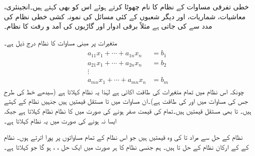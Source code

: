 خطی تفرقی مساوات کے نظام کا نام چھوٹا کرتے ہوئے اس کو   بھی کہتے ہیں۔انجینئری، معاشیات، شماریات، اور دیگر شعبوں کے کئی مسائل کی نمونہ کشی خطی نظام کی مدد سے کی جاتی ہے مثلاً برقی ادوار اور گاڑیوں کی آمد و رفت کا نظام۔

 متغیرات پر مبنی  مساوات کا نظام درج ذیل ہے۔
\begin{gather}
\begin{aligned}\label{مساوات_الجبرا_خطی_نظام_الف}
a_{11}x_1+\cdots+a_{1n}x_n&=b_1\\
a_{21}x_1+\cdots+a_{2n}x_n&=b_2\\
\vdots\\
a_{mn}x_1+\cdots+a_{mn}x_n&=b_m
\end{aligned}
\end{gather}
چونکہ اس نظام میں تمام متغیرات کی طاقت اکائی  ہے لہٰذا یہ نظام  کہلاتا ہے (سیدھے خط کی طرح جس کی مساوات  میں  اور  کی طاقت  ہے)۔ان مساوات میں  تا  مستقل قیمتیں ہیں جنہیں نظام کے  کہتے ہیں۔  تا  بھی مستقل قیمتیں ہیں۔تمام  کی قیمت صفر ہونے کی صورت میں  کا نظام  نظام کہلاتا ہے جبکہ ایسا نہ ہونے کی صورت میں یہ  نظام کہلاتا ہے۔

نظام  کے حل سے مراد  تا  کی وہ قیمتیں ہیں جو اس نظام کے تمام مساواتوں پر پورا اترتے ہوں۔ نظام کے  کے ارکان نظام  کے حل  تا  ہیں۔ ہم جنسی نظام کا ہر صورت میں ایک حل ، ،   ہو گا جو  کہلاتا ہے۔

